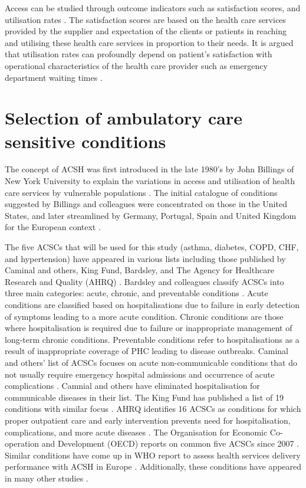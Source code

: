 Access can be studied through outcome indicators such as satisfaction scores, and utilisation rates \cite{rogers1973american}. The satisfaction scores are based on the health care services provided by the supplier and expectation of the clients or patients in reaching and utilising these health care services in proportion to their needs. It is argued that utilisation rates can profoundly depend on patient's satisfaction with operational characteristics of the health care provider such as emergency department waiting times \cite{morgan2015demographic}.

\section{Selection of ambulatory care sensitive conditions}

The concept of ACSH was first introduced in the late 1980's by John Billings of New York University to explain the variations in access and utilisation of health care services by vulnerable populations \cite{WHO:health:hospitalizations}. The initial catalogue of conditions suggested by Billings and colleagues were concentrated on those in the United States, and later streamlined by Germany, Portugal, Spain and United Kingdom for the European context \cite{WHO:health:hospitalizations}. 

The five ACSCs that will be used for this study (asthma, diabetes, COPD, CHF, and hypertension) have appeared in various lists including those published by Caminal and others, King Fund, Bardsley, and The Agency for Healthcare Research and Quality (AHRQ) \cite{caminal2004role,The:Kings:Fund,bardsley2013secondary}. Bardsley and colleagues classify ACSCs into three main categories: acute, chronic, and preventable conditions \cite{bardsley2013secondary}. Acute conditions are classified based on hospitalisations due to failure in early detection of symptoms leading to a more acute condition. Chronic conditions are those where hospitalisation is required due to failure or inappropriate management of long-term chronic conditions. Preventable conditions refer to hospitalisations as a result of inappropriate coverage of PHC leading to disease outbreaks. Caminal and others' list of ACSCs focuses on acute non-communicable conditions that do not usually require emergency hospital admissions and occurrence of acute complications \cite{caminal2004role}. Camnial and others have eliminated hospitalisation for communicable diseases in their list. The King Fund has published a list of 19 conditions with similar focus \cite{The:Kings:Fund}. AHRQ identifies 16 ACSCs as conditions for which proper outpatient care and early intervention prevents need for hospitalisation, complications, and more acute diseases \cite{guide:AHRQ:2001}. The Organisation for Economic Co-operation and Development (OECD) reports on common five ACSCs since 2007 \cite{WHO:health:hospitalizations,OECD:Data:countries}. Similar conditions have come up in WHO report to assess health services delivery performance with ACSH in Europe \cite{WHO:assess:acsh}. Additionally, these conditions have appeared in many other studies \cite{ansari2012patient,magan2011hospitalizations,ansari2006access,laditka2003hospital,foland2000avoidable,ricketts2001hospitalization}. 


